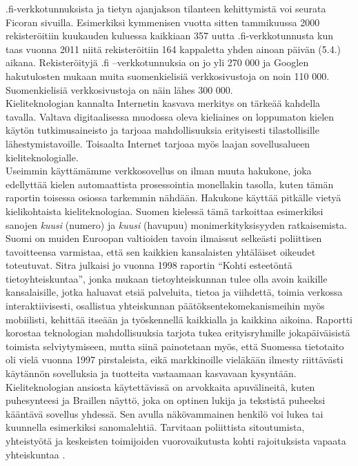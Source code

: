 \begin{multicols}{2}
.fi-verkkotunnuksista ja tietyn ajanjakson tilanteen kehittymistä voi
seurata Ficoran sivuilla. Esimerkiksi kymmenisen vuotta sitten
tammikuussa 2000 rekisteröitiin kuukauden kuluessa kaikkiaan 357 uutta
.fi-verkkotunnusta kun taas vuonna 2011 niitä rekisteröitiin 164
kappaletta yhden ainoan päivän (5.4.)  aikana. Rekisteröityjä .fi
–verkkotunnuksia on jo yli 270 000 ja Googlen hakutulosten mukaan
muita suomenkielisiä verkkosivustoja on noin 110 000.  Suomenkielisiä
verkkosivustoja on näin lähes 300 000.\\
Kieliteknologian kannalta Internetin kasvava merkitys on tärkeää
kahdella tavalla. Valtava digitaalisessa muodossa oleva kieliaines
on loppumaton kielen käytön tutkimusaineisto ja tarjoaa mahdollisuuksia erityisesti 
tilastollisille  lähestymistavoille. Toisaalta Internet tarjoaa myös 
laajan sovellusalueen kieliteknologialle.\\
Useimmin käyttämämme verkkosovellus on ilman muuta hakukone, joka
edellyttää kielen automaattista prosessointia monellakin tasolla,
kuten tämän raportin toisessa osiossa tarkemmin nähdään. Hakukone käyttää
pitkälle vietyä kielikohtaista kieliteknologiaa. Suomen kielessä tämä tarkoittaa 
esimerkiksi  sanojen \textit{kuusi} (numero)
ja \textit{kuusi} (havupuu) monimerkityksisyyden ratkaisemista.\\
Suomi on muiden Euroopan valtioiden tavoin ilmaissut selkeästi
poliittisen tavoitteensa varmistaa, että sen kaikkien kansalaisten yhtäläiset
oikeudet toteutuvat. Sitra julkaisi jo vuonna 1998 raportin “Kohti
esteetöntä tietoyhteiskuntaa”, jonka mukaan tietoyhteiskunnan
tulee olla avoin kaikille kansalaisille, jotka haluavat 
etsiä palveluita, tietoa ja viihdettä, toimia verkossa
interaktiivisesti, osallistua yhteiskunnan päätöksentekomekanismeihin
myös mobiilisti, kehittää itseään ja työskennellä kaikkialla ja
kaikkina aikoina. Raportti korostaa teknologian mahdollisuuksia
tarjota tukea erityisryhmille jokapäiväisistä toimista selviytymiseen,
mutta siinä painotetaan myös, että Suomessa tietotaito oli vielä
vuonna 1997 pirstaleista, eikä markkinoille vieläkään ilmesty riittävästi käytännön
sovelluksia ja tuotteita vastaamaan kasvavaan kysyntään. Kieliteknologian ansiosta
käytettävissä on arvokkaita apuvälineitä, kuten puhesynteesi ja Braillen
näyttö, joka on optinen lukija ja tekstistä puheeksi kääntävä sovellus yhdessä. 
Sen avulla näkövammainen henkilö voi lukea tai kuunnella esimerkiksi sanomalehtiä. 
Tarvitaan poliittista sitoutumista, yhteistyötä ja keskeisten toimijoiden 
vuorovaikutusta  kohti rajoituksista vapaata yhteiskuntaa \cite{Sitra1998}.\\

\end{multicols}
